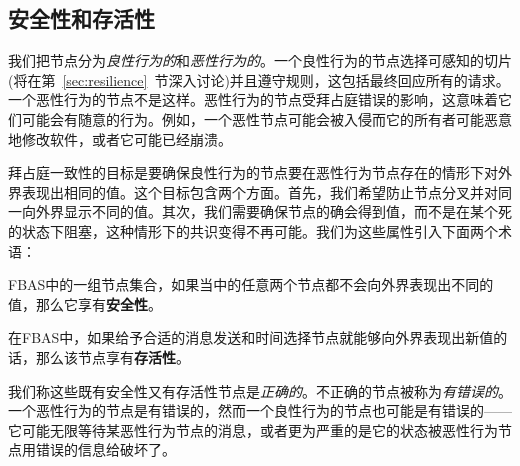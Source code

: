 \subsection{安全性和存活性}\label{sec:fba-safe-live}

我们把节点分为\textit{良性行为的}和\textit{恶性行为的}。一个良性行为的节点选择可感知的{\quorum}切片(将在第~\ref{sec:resilience}~节深入讨论)并且遵守规则，这包括最终回应所有的请求。一个恶性行为的节点不是这样。恶性行为的节点受拜占庭错误的影响，这意味着它们可能会有随意的行为。例如，一个恶性节点可能会被入侵而它的所有者可能恶意地修改软件，或者它可能已经崩溃。

拜占庭一致性的目标是要确保良性行为的节点要在恶性行为节点存在的情形下对外界表现出相同的值。这个目标包含两个方面。首先，我们希望防止节点分叉并对同一{\slot}向外界显示不同的值。其次，我们需要确保节点的确会得到值，而不是在某个死的状态下阻塞，这种情形下的共识变得不再可能。我们为这些属性引入下面两个术语：

\begin{definition}[安全性]
	FBAS中的一组节点集合，如果当中的任意两个节点都不会向外界表现出不同的值，那么它享有{\textbf{安全性}}。
\end{definition}

\begin{definition}[存活性]
	在FBAS中，如果给予合适的消息发送和时间选择节点就能够向外界表现出新值的话，那么该节点享有{\textbf{存活性}}。
\end{definition}

我们称这些既有安全性又有存活性节点是\textit{正确的}。不正确的节点被称为{\textit{有错误的}}。一个恶性行为的节点是有错误的，然而一个良性行为的节点也可能是有错误的——它可能无限等待某恶性行为节点的消息，或者更为严重的是它的状态被恶性行为节点用错误的信息给破坏了。


